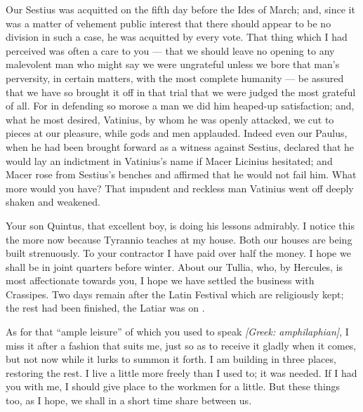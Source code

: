 

 Our Sestius was acquitted on the fifth day before the Ides of March; and, since it was a matter of vehement public interest that there should appear to be no division in such a case, he was acquitted by every vote. That thing which I had perceived was often a care to you --- that we should leave no opening to any malevolent man who might say we were ungrateful unless we bore that man's perversity, in certain matters, with the most complete humanity --- be assured that we have so brought it off in that trial that we were judged the most grateful of all. For in defending so morose a man we did him heaped-up satisfaction; and, what he most desired, Vatinius, by whom he was openly attacked, we cut to pieces at our pleasure, while gods and men applauded. Indeed even our Paulus, when he had been brought forward as a witness against Sestius, declared that he would lay an indictment in Vatinius's name if Macer Licinius hesitated; and Macer rose from Sestius's benches and affirmed that he would not fail him. What more would you have? That impudent and reckless man Vatinius went off deeply shaken and weakened.

 Your son Quintus, that excellent boy, is doing his lessons admirably. I notice this the more now because Tyrannio teaches at my house. Both our houses are being built strenuously. To your contractor I have paid over half the money. I hope we shall be in joint quarters before winter. About our Tullia, who, by Hercules, is most affectionate towards you, I hope we have settled the business with Crassipes. Two days remain after the Latin Festival which are religiously kept; \dag the rest had been finished, the Latiar was on \dag.

 As for that ``ample leisure'' of which you used to speak \textit{[Greek: amphilaphian]}, I miss it after a fashion that suits me, just so as to receive it gladly when it comes, but not now while it lurks to summon it forth. I am building in three places, restoring the rest. I live a little more freely than I used to; it was needed. If I had you with me, I should give place to the workmen for a little. But these things too, as I hope, we shall in a short time share between us.


